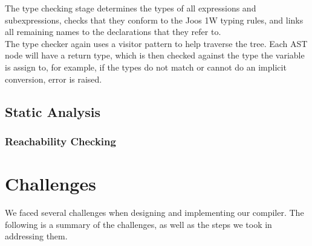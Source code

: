 \documentclass[12pt, a4paper]{article}
\begin{document}
The type checking stage determines the types of all expressions and subexpressions, checks that they conform to the Joos 1W typing rules, and links all remaining names to the declarations that they refer to. \\

The type checker again uses a visitor pattern to help traverse the tree. Each AST node will have a return type, which is then checked against the type the variable is assign to, for example, if the types do not match or cannot do an implicit conversion, error is raised.

\subsection{Static Analysis}

\subsubsection*{Reachability Checking}



\section{Challenges}

We faced several challenges when designing and implementing our compiler. The following is a summary of the challenges, as well as the steps we took in addressing them.
\end{document}

